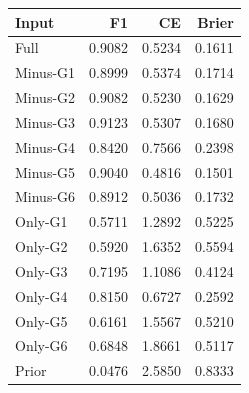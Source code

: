 \begin{tabular}{lrrr}
\toprule
Input & F1 & CE & Brier \\
\midrule
Full & 0.9082 & 0.5234 & 0.1611 \\
Minus-G1 & 0.8999 & 0.5374 & 0.1714 \\
Minus-G2 & 0.9082 & 0.5230 & 0.1629 \\
Minus-G3 & 0.9123 & 0.5307 & 0.1680 \\
Minus-G4 & 0.8420 & 0.7566 & 0.2398 \\
Minus-G5 & 0.9040 & 0.4816 & 0.1501 \\
Minus-G6 & 0.8912 & 0.5036 & 0.1732 \\
Only-G1 & 0.5711 & 1.2892 & 0.5225 \\
Only-G2 & 0.5920 & 1.6352 & 0.5594 \\
Only-G3 & 0.7195 & 1.1086 & 0.4124 \\
Only-G4 & 0.8150 & 0.6727 & 0.2592 \\
Only-G5 & 0.6161 & 1.5567 & 0.5210 \\
Only-G6 & 0.6848 & 1.8661 & 0.5117 \\
Prior & 0.0476 & 2.5850 & 0.8333 \\
\bottomrule
\end{tabular}

